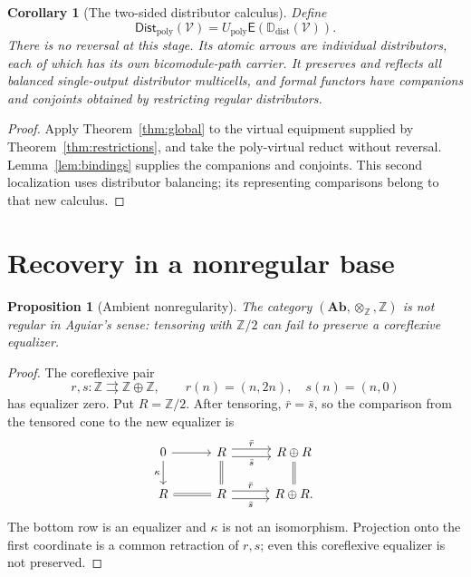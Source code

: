 \documentclass[11pt,a4paper]{article}
\newtheorem{proposition}[theorem]{Proposition}
\newtheorem{corollary}[theorem]{Corollary}
\theoremstyle{definition}
\theoremstyle{remark}
\numberwithin{equation}{section}
\newcommand{\V}{\mathcal V}
\newcommand{\Ecal}{\mathsf E}
\newcommand{\Z}{\mathbb Z}
\newcommand{\Ab}{\mathbf{Ab}}
\newcommand{\Up}{U_{\mathrm{poly}}}
\newcommand{\Ddist}{\mathbb D_{\mathrm{dist}}}
\newcommand{\FDist}{\mathsf{Dist}_{\mathrm{poly}}}
\begin{document}
\begin{corollary}[The two-sided distributor calculus]\label{cor:distributor-completion}
Define
\[
\FDist(\V)=\Up\Ecal(\Ddist(\V)).
\]
There is no reversal at this stage. Its atomic arrows are individual
distributors, each of which has its own bicomodule-path carrier. It
preserves and reflects all balanced single-output distributor multicells,
and formal functors have companions and conjoints obtained by restricting
regular distributors.
\end{corollary}
\begin{proof}
Apply Theorem~\ref{thm:global} to the virtual equipment supplied by
Theorem~\ref{thm:restrictions}, and take the poly-virtual reduct without
reversal. Lemma~\ref{lem:bindings} supplies the companions and conjoints.
This second localization uses distributor balancing; its representing
comparisons belong to that new calculus.
\end{proof}

\section{Recovery in a nonregular base}\label{sec:old}

\begin{proposition}[Ambient nonregularity]\label{prop:ab-nonregular}
The category $(\Ab,\otimes_{\Z},\Z)$ is not regular in Aguiar's sense:
tensoring with $\Z/2$ can fail to preserve a coreflexive equalizer.
\end{proposition}
\begin{proof}
The coreflexive pair
\[
r,s:\Z\rightrightarrows\Z\oplus\Z,\qquad
r(n)=(n,2n),\quad s(n)=(n,0)
\]
has equalizer zero. Put $R=\Z/2$. After tensoring, $\bar r=\bar s$, so
the comparison from the tensored cone to the new equalizer is
\[
\begin{tikzcd}[column sep=3em]
0 \arrow[r] \arrow[d,"\kappa"'] &
R \arrow[r,shift left=.7ex,"\bar r"]
  \arrow[r,shift right=.7ex,"\bar s"'] \arrow[d,equal] &
R\oplus R \arrow[d,equal]\\
R \arrow[r,equal] &
R \arrow[r,shift left=.7ex,"\bar r"]
  \arrow[r,shift right=.7ex,"\bar s"'] &
R\oplus R.
\end{tikzcd}
\]
The bottom row is an equalizer and $\kappa$ is not an isomorphism.
Projection onto the first coordinate is a common retraction of $r,s$;
even this coreflexive equalizer is not preserved.
\end{proof}
\end{document}
